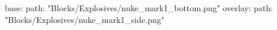 base:
  path: "Blocks/Explosives/nuke_mark1_bottom.png"
overlay:
  path: "Blocks/Explosives/nuke_mark1_side.png"